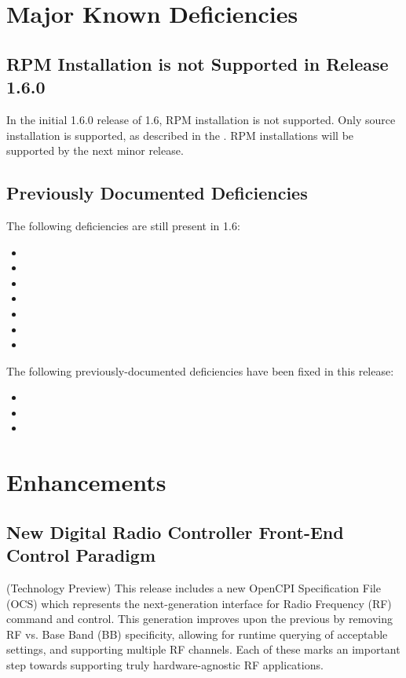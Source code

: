 \section{Major Known Deficiencies}
\label{sec:16_bugs}

\subsection{RPM Installation is not Supported in Release 1.6.0}
\label{bug:norpm}
In the initial 1.6.0 release of 1.6, RPM installation is not supported.  Only source installation is supported, as described in the .  RPM installations will be supported by the next minor release.


\subsection{Previously Documented Deficiencies}
The following deficiencies are still present in 1.6:
\begin{itemize}
\setlength\itemsep{0em} %
\item {}
\item {}
\item {}
\item {}
\item {}
\item {}
\item {}
\end{itemize}

The following previously-documented deficiencies have been fixed in this release:
\begin{itemize}
\setlength\itemsep{0em} %
\item {}
\item {}
\item {}
\end{itemize}


\newpage
{}
\def\ocpiversion{v1.5.0}  %
\section{Enhancements}
\subsection{New Digital Radio Controller Front-End Control Paradigm} (Technology Preview) %
\label{sec:15_drc}
This release includes a new OpenCPI Specification File (OCS) which represents the next-generation interface for Radio Frequency (RF) command and control.
This generation improves upon the previous by removing RF vs. Base Band (BB) specificity, allowing for runtime querying of acceptable settings, and supporting multiple RF channels.
Each of these marks an important step towards supporting truly hardware-agnostic RF applications. \\

